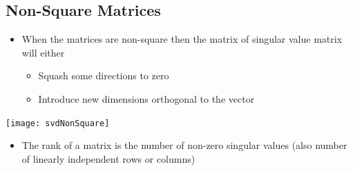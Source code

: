 
\begin{slide}
\section[-2]{Non-Square Matrices}

\begin{PauseHighLight}
  \begin{itemize}
  \item When the matrices are non-square then the matrix of singular
    value matrix will either
    \begin{itemize}
    \item Squash some directions to zero\pause
    \item Introduce new dimensions orthogonal to the vector
    \end{itemize}
  \end{itemize}
\end{PauseHighLight}
\begin{center}
  \texttt{[image: svdNonSquare]}\pause
\end{center}
\begin{PauseHighLight}
  \begin{itemize}
  \item The rank of a matrix is the number of non-zero singular values
    (also number of linearly independent rows or columns)\pause
  \end{itemize}
\end{PauseHighLight}

\end{slide}



